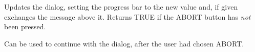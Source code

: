 \label{wxprogressdialogupdate}


Updates the dialog, setting the progress bar to the new value and, if
given exchanges the message above it. Returns TRUE if the ABORT button 
has \emph{not} been pressed.


\label{wxprogressdialogresume}

Can be used to continue with the dialog, after the user had chosen
ABORT.



